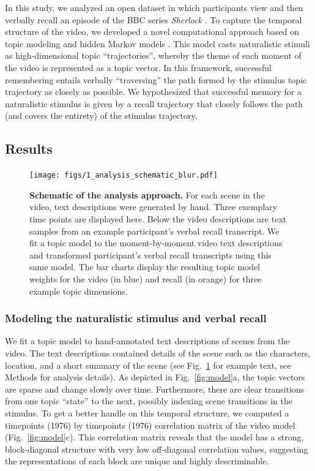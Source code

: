 \documentclass{article}
\begin{document}
{In this study, we analyzed an open dataset in which participants view and then verbally recall an episode of the BBC series \textit{Sherlock} \citep{ChenEtal17}. To capture the temporal structure of the video, we developed a novel computational approach based on topic modeling \citep{BleiEtal03} and hidden Markov models \citep{Rabi89, BaldEtal17}. This model casts naturalistic stimuli as high-dimensional topic ``trajectories'', whereby the theme of each moment of the video is represented as a topic vector. In this framework, successful remembering entails verbally ``traversing'' the path formed by the stimulus topic trajectory as closely as possible. We hypothesized that successful memory for a naturalistic stimulus is given by a recall trajectory that closely follows the path (and covers the entirety) of the stimulus trajectory.

\subsection{Results}

\begin{figure}[th!]
\centering
\texttt{[image: figs/1\_analysis\_schematic\_blur.pdf]}
\caption{\small \textbf{Schematic of the analysis approach.} For each scene in the video, text descriptions were generated by hand. Three exemplary time points are displayed here.  Below the video descriptions are text samples from an example participant's verbal recall transcript.  We fit a topic model to the moment-by-moment video text descriptions and transformed participant's verbal recall transcripts using this same model. The bar charts display the resulting topic model weights for the video (in blue) and recall (in orange) for three example topic dimensions.}
\label{fig:schematic}
\end{figure}

\subsubsection{Modeling the naturalistic stimulus and verbal recall}
We fit a topic model \citep{BleiEtal03} to hand-annotated text descriptions of scenes from the video. The text descriptions contained details of the scene such as the characters, location, and a short summary of the scene (see Fig.~\ref{fig:schematic} for example text, see Methods for analysis details). As depicted in Fig.~\ref{fig:model}a, the topic vectors are sparse and change slowly over time. Furthermore, there are clear transitions from one topic ``state'' to the next, possibly indexing scene transitions in the stimulus. To get a better handle on this temporal structure, we computed a timepoints (1976) by timepoints (1976) correlation matrix of the video model (Fig.~\ref{fig:model}c).  This correlation matrix reveals that the model has a strong, block-diagonal structure with very low off-diagonal correlation values, suggesting the representations of each block are unique and highly descriminable.

}
\end{document}
